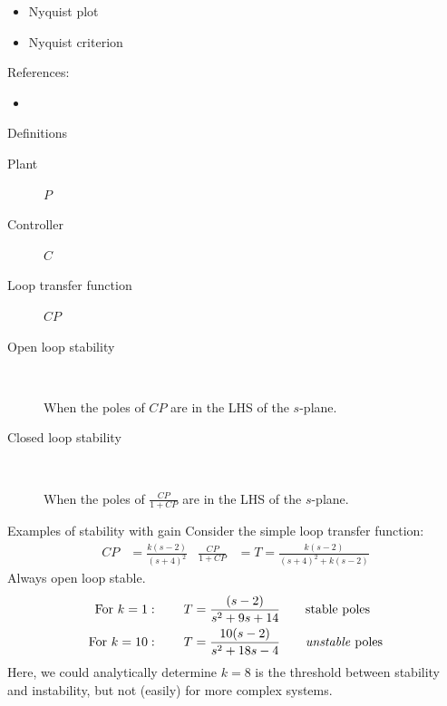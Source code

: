 \documentclass[10pt]{beamer-control}
\begin{document}

\begin{SUMMARY}
\begin{itemize}
\item Nyquist plot
\item Nyquist criterion
\end{itemize}
\vfill References:
\begin{itemize}
\item \astrom[§10.2]
\end{itemize}
\end{SUMMARY}



\begin{frame}{Definitions}
\begin{description}
  \item[Plant] $P$
  \item[Controller] $C$
  \item[Loop transfer function] $CP$

  \item[Open loop stability]\

  When the poles of $CP$ are in the LHS of the $s$-plane.

  \item[Closed loop stability]\

  When the poles of $\frac{CP}{1+CP}$ are in the LHS of the $s$-plane.

\end{description}
\end{frame}


\begin{frame}{Examples of stability with gain}
Consider the simple loop transfer function:
\begin{align*}
CP &= \frac{k(s-2)}{(s+4)^2} & \frac{CP}{1+CP} &= T = \frac{k(s-2)}{(s+4)^2+k(s-2)}
\end{align*}
Always open loop stable.
\begin{align*}
\text{For } k= 1:\qquad T &= \frac{(s-2)}{s^2+9s+14} \qquad \text{stable poles}\\
\text{For } k=10:\qquad T &= \frac{10(s-2)}{s^2+18s-4} \qquad \text{\emph{unstable} poles}
\end{align*}
Here, we could analytically determine $k=8$ is the threshold between stability and instability, but not (easily) for more complex systems.
\end{frame}


\end{document}
